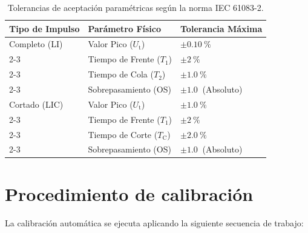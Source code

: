\begin{table}[H]
    \centering
    \caption{Tolerancias de aceptación paramétricas según la norma IEC 61083-2.}
    \label{tab:tolerancias_iec61083}
    \begin{tabular}{@{}lll@{}}
        \toprule
        \textbf{Tipo de Impulso} & \textbf{Parámetro Físico}      & \textbf{Tolerancia Máxima} \\ \midrule
        Completo (LI)            & Valor Pico ($U_\text{t}$)      & $\pm\SI{0,10}{\percent}$   \\ \cmidrule(l){2-3}
                                 & Tiempo de Frente ($T_1$)       & $\pm\SI{2}{\percent}$      \\ \cmidrule(l){2-3}
                                 & Tiempo de Cola ($T_2$)         & $\pm\SI{1,0}{\percent}$    \\ \cmidrule(l){2-3}
                                 & Sobrepasamiento (OS)           & $\pm\SI{1,0}{}$ (Absoluto) \\ \midrule
        Cortado (LIC)            & Valor Pico ($U_\text{t}$)      & $\pm\SI{1,0}{\percent}$    \\ \cmidrule(l){2-3}
                                 & Tiempo de Frente ($T_1$)       & $\pm\SI{2}{\percent}$      \\ \cmidrule(l){2-3}
                                 & Tiempo de Corte ($T_\text{C}$) & $\pm\SI{2,0}{\percent}$    \\ \cmidrule(l){2-3}
                                 & Sobrepasamiento (OS)           & $\pm\SI{1,0}{}$ (Absoluto) \\ \bottomrule
    \end{tabular}
\end{table}

\section{Procedimiento de calibración}
\label{sec:procedimiento_calibracion}

La calibración automática se ejecuta aplicando la siguiente secuencia de trabajo:

